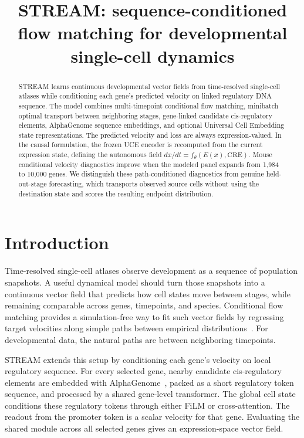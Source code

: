 \documentclass[11pt]{article}
\title{STREAM: sequence-conditioned flow matching for developmental single-cell dynamics}
\author{}
\date{}
\newcommand{\stream}{STREAM}
\newcommand{\uce}{UCE}
\newcommand{\ag}{AlphaGenome}
\begin{document}
\maketitle

\begin{abstract}
\stream{} learns continuous developmental vector fields from time-resolved
single-cell atlases while conditioning each gene's predicted velocity on linked
regulatory DNA sequence. The model combines multi-timepoint conditional flow
matching, minibatch optimal transport between neighboring stages, gene-linked
candidate cis-regulatory elements, \ag{} sequence embeddings, and optional
Universal Cell Embedding state representations. The predicted velocity and loss
are always expression-valued. In the causal formulation, the frozen \uce{}
encoder is recomputed from the current expression state, defining the
autonomous field $dx/dt=f_\theta(E(x),\mathrm{CRE})$. Mouse conditional
velocity diagnostics improve when the modeled panel expands from 1,984 to
10,000 genes. We distinguish these path-conditioned diagnostics from genuine
held-out-stage forecasting, which transports observed source cells without
using the destination state and scores the resulting endpoint distribution.
\end{abstract}

\section{Introduction}

Time-resolved single-cell atlases observe development as a sequence of
population snapshots. A useful dynamical model should turn those snapshots into
a continuous vector field that predicts how cell states move between stages,
while remaining comparable across genes, timepoints, and species. Conditional
flow matching provides a simulation-free way to fit such vector fields by
regressing target velocities along simple paths between empirical
distributions~\cite{lipman2023flow,tong2023minibatchot}. For developmental
data, the natural paths are between neighboring timepoints.

\stream{} extends this setup by conditioning each gene's velocity on local
regulatory sequence. For every selected gene, nearby candidate cis-regulatory
elements are embedded with \ag{}~\cite{avsec2026alphagenome}, packed as a short
regulatory token sequence, and processed by a shared gene-level transformer.
The global cell state conditions these regulatory tokens through either FiLM or
cross-attention. The readout from the promoter token is a scalar velocity for
that gene. Evaluating the shared module across all selected genes gives an
expression-space vector field.
\end{document}
